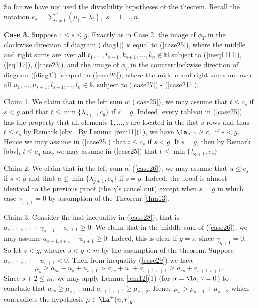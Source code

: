 So far we have not used the divisibility hypotheses of the theorem. Recall the notation $c_s= \sum_{i=1}^{s}(\mu_i - \lambda_i)$,\ $s=1,\dots,n$.

\textbf{Case 3.} Suppose $1 \le s \le g.$ Exactly as in Case 2, the image of $\phi_T$ in the clockwise direction of diagram (\ref{diag1}) is equal to (\ref{case25}), where the middle and right sums are over all  $t_1,\dots,t_{s+1},k_{s+1},\dots,k_n \in \mathbb{N}$ subject to (\ref{ineq1111}), (\ref{eq117}), (\ref{case23}), and the image of $\phi_T$ in the counterclockwise direction of diagram (\ref{diag1}) is equal to (\ref{case26}), where the middle and right sums are over all  $u_1,\dots,u_{s+1},l_{s+1},\dots,l_n \in \mathbb{N}$ subject to (\ref{case27}) - (\ref{case211}).

Claim 1. We claim that in the left sum of (\ref{case25}), we may assume that $t \le c_s$ if $s<g$ and that $t \le \min\{\lambda_{g+1}, c_g\}$ if $s=g$. Indeed, every tableau in  (\ref{case25}) has the property that all elements $1,\dots,s$ are located in the first $s$ rows and thus $t \le c_s$ by Remark \ref{obv}. By Lemma \ref{rem11}(1), we have $\la_{s+1} \ge c_s$ if $s<g$. Hence we may assume in (\ref{case25}) that $t \le c_s$ if $s<g$. If $s=g$, then by Remark \ref{obv}, $t \le c_g$ and we may assume in (\ref{case25}) that $t \le \min\{\lambda_{g+1}, c_g\}$

Claim 2. We claim that in the left sum of (\ref{case26}), we may assume that $u \le c_s$ if $s<g$ and that $u \le \min\{\lambda_{g+1}, c_g\}$ if $s=g$. Indeed, the proof is almost identical to the previous proof (the $\gamma$'s cancel out) except when $s=g$ in which case $\gamma_{s+1}=0$ by assumption of the Theorem \ref{thm13}.
 
 Claim 3. Consider the last inequality in (\ref{case28}), that is $a_{s+1,s+1}+\gamma_{s+1}-u_{s+1} \ge 0$.  We claim that in the middle sum of (\ref{case26}), we may assume $a_{s+1,s+1}-u_{s+1} \ge 0$. Indeed, this is clear if $g=s$, since $\gamma_{g+1}=0.$ So let $s<g$, whence $s<g<m$ by the assumption of the theorem. Suppose  $a_{s+1,s+1}-u_{s+1}<0$.  Then from inequality (\ref{case29}) we have
 \[\mu_s \ge a_{ss}+u_s+u_{s+1} > a_{ss}+u_s+a_{s+1, s+1} \ge a_{ss}+a_{s+1, s+1}.\]
 Since $s+2 \le m$, we may apply Lemma \ref{lem12}(1) (for $\alpha = \la, \gamma = 0$) to conclude that  $a_{ss} \ge \mu_{s+1}$ and $a_{s+1,s+1} \ge \mu_{s+2}$. Hence $\mu_s > \mu_{s+1}+\mu_{s+2}$ which contradicts the hypothesis $\mu \in \La^{+}(n,r)_g$.
 
